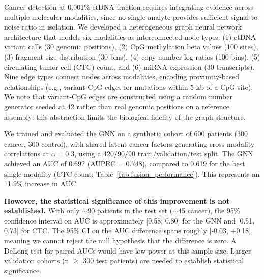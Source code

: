 \documentclass[10pt,a4paper]{article}
\begin{document}
Cancer detection at 0.001\% ctDNA fraction requires integrating evidence across multiple molecular modalities, since no single analyte provides sufficient signal-to-noise ratio in isolation. We developed a heterogeneous graph neural network architecture that models six modalities as interconnected node types: (1) ctDNA variant calls (30 genomic positions), (2) CpG methylation beta values (100 sites), (3) fragment size distribution (30 bins), (4) copy number log-ratios (100 bins), (5) circulating tumor cell (CTC) count, and (6) miRNA expression (30 transcripts). Nine edge types connect nodes across modalities, encoding proximity-based relationships (e.g., variant-CpG edges for mutations within 5 kb of a CpG site). We note that variant-CpG edges are constructed using a random number generator seeded at 42 rather than real genomic positions on a reference assembly; this abstraction limits the biological fidelity of the graph structure.

We trained and evaluated the GNN on a synthetic cohort of 600 patients (300 cancer, 300 control), with shared latent cancer factors generating cross-modality correlations at $\alpha = 0.3$, using a 420/90/90 train/validation/test split. The GNN achieved an AUC of 0.692 (AUPRC = 0.748), compared to 0.619 for the best single modality (CTC count; Table~\ref{tab:fusion_performance}). This represents an 11.9\% increase in AUC.

\textbf{However, the statistical significance of this improvement is not established.} With only $\sim$90 patients in the test set ($\sim$45 cancer), the 95\% confidence interval on AUC is approximately [0.58, 0.80] for the GNN and [0.51, 0.73] for CTC. The 95\% CI on the AUC difference spans roughly [-0.03, +0.18], meaning we cannot reject the null hypothesis that the difference is zero. A DeLong test for paired AUCs would have low power at this sample size. Larger validation cohorts (n $\geq$ 300 test patients) are needed to establish statistical significance.
\end{document}
